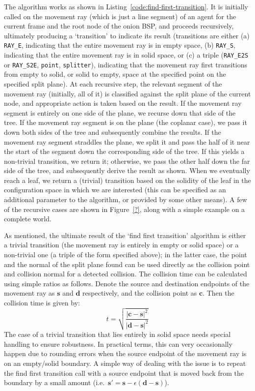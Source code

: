 \documentclass[10pt,twocolumn]{article}
\begin{document}
The algorithm works as shown in Listing~\ref{code:find-first-transition}. It is initially called on the movement ray (which is just a line segment) of an agent for the current frame and the root node of the onion BSP, and proceeds recursively, ultimately producing a `transition' to indicate its result (transitions are either (a) \texttt{RAY\_E}, indicating that the entire movement ray is in empty space, (b) \texttt{RAY\_S}, indicating that the entire movement ray is in solid space, or (c) a triple (\texttt{RAY\_E2S} or \texttt{RAY\_S2E}, \texttt{point}, \texttt{splitter}), indicating that the movement ray first transitions from empty to solid, or solid to empty, space at the specified point on the specified split plane). At each recursive step, the relevant segment of the movement ray (initially, all of it) is classified against the split plane of the current node, and appropriate action is taken based on the result. If the movement ray segment is entirely on one side of the plane, we recurse down that side of the tree. If the movement ray segment is on the plane (the coplanar case), we pass it down both sides of the tree and subsequently combine the results. If the movement ray segment straddles the plane, we split it and pass the half of it near the start of the segment down the corresponding side of the tree. If this yields a non-trivial transition, we return it; otherwise, we pass the other half down the far side of the tree, and subsequently derive the result as shown. When we eventually reach a leaf, we return a (trivial) transition based on the solidity of the leaf in the configuration space in which we are interested (this can be specified as an additional parameter to the algorithm, or provided by some other means). A few of the recursive cases are shown in Figure~\ref{?}, along with a simple example on a complete world.

As mentioned, the ultimate result of the `find first transition' algorithm is either a trivial transition (the movement ray is entirely in empty or solid space) or a non-trivial one (a triple of the form specified above); in the latter case, the point and the normal of the split plane found can be used directly as the collision point and collision normal for a detected collision. The collision time can be calculated using simple ratios as follows. Denote the source and destination endpoints of the movement ray as $\mathbf{s}$ and $\mathbf{d}$ respectively, and the collision point as $\mathbf{c}$. Then the collision time is given by:
%
\[
t = \sqrt{\frac{|\mathbf{c} - \mathbf{s}|^2}{|\mathbf{d} - \mathbf{s}|^2}}
\]
%
The case of a trivial transition that lies entirely in solid space needs special handling to ensure robustness. In practical terms, this can very occasionally happen due to rounding errors when the source endpoint of the movement ray is on an empty/solid boundary. A simple way of dealing with the issue is to repeat the find first transition call with a source endpoint that is moved back from the boundary by a small amount (i.e.~$\mathbf{s'} = \mathbf{s} - \epsilon(\mathbf{d} - \mathbf{s})$).
\end{document}
